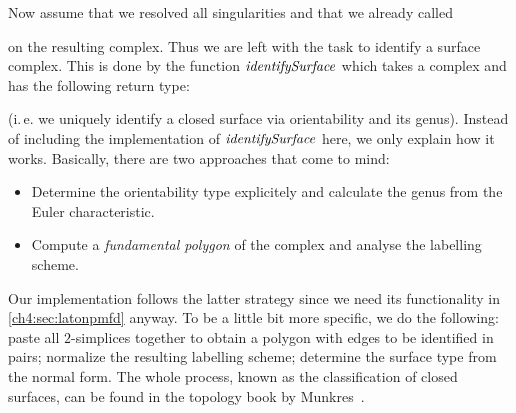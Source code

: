 Now assume that we resolved all singularities and that we already called\begin{hscode}\SaveRestoreHook
{}%
%
%
\>[3]{}\mathbin{::}\;\<[E]%
\ColumnHook
\end{hscode}\resethooks
on the resulting complex. Thus we are left with the task to identify a surface
complex. This is done by the function \ensuremath{\Varid{identifySurface}} which takes a complex
and has the following return type:
\resethooks
(i.\,e. we uniquely identify a closed surface via orientability
and its genus). Instead of including the implementation of
\ensuremath{\Varid{identifySurface}} here, we only explain how it works. Basically,
there are two approaches that come to mind:
\begin{itemize}[topsep=5pt,labelindent=0pt]
\item
    Determine the orientability type explicitely and calculate the genus from
    the Euler characteristic.
\item
    Compute a \emph{fundamental polygon} of the complex and analyse
    the labelling scheme.
\end{itemize}
Our implementation follows the latter strategy since we need its functionality
in \cref{ch4:sec:latonpmfd} anyway. To be a little bit more specific, we do the
following: paste all $2$-simplices together to obtain a polygon with edges to be
identified in pairs; normalize the resulting labelling scheme; determine the
surface type from the normal form. The whole process, known as the
classification of closed surfaces, can be found in the topology book by
Munkres~\cite[Ch.~12]{bookc:munkres00}.

